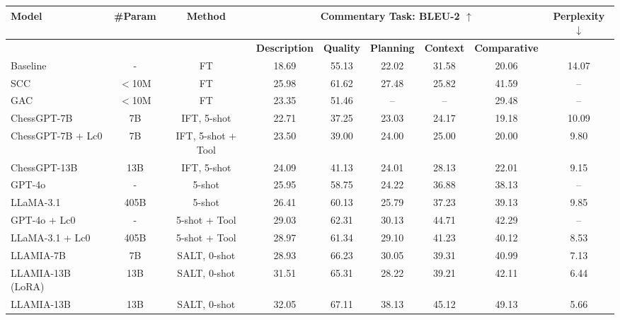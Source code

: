 \documentclass{article}
\newcommand{\valbest}[1]{\colorbox{valbest}{#1}}
\theoremstyle{plain}
\theoremstyle{definition}
\theoremstyle{remark}
\begin{document}
\begin{table}[!h]
    \centering
    \begin{adjustbox}{max width=0.99\textwidth}
    \begin{tabular}{lcc|ccccc|c}
    \toprule[1.2pt]
        \textbf{Model}& \textbf{\#Param} & \textbf{Method} & \multicolumn{5}{c}{\textbf{Commentary Task: BLEU-2 $\uparrow$}} & \textbf{Perplexity$\downarrow$}\\ \toprule
        &&&  \textbf{Description} & \textbf{Quality} & \textbf{Planning} & \textbf{Context} & \textbf{Comparative} \\
        \toprule
    \makecell{Baseline\\\cite{jhamtani-etal-2018-learning}} & - & FT & 18.69 & 55.13 & 22.02 & 31.58 & 20.06 & 14.07 \\
    \makecell{SCC\\\cite{zang2019automated}} & $<$10M & FT & 25.98 & 61.62 & 27.48 & 25.82 & 41.59 & -- \\
    \makecell{GAC\\\cite{jhamtani-etal-2018-learning}} & $<$10M & FT & 23.35 & 51.46 & -- & -- & 29.48 & -- \\
    \midrule
    ChessGPT-7B & 7B & IFT, 5-shot & 22.71 & 37.25 & 23.03 & 24.17 & 19.18 & 10.09 \\
    ChessGPT-7B + Lc0 & 7B & IFT, 5-shot + Tool & 23.50 & 39.00 & 24.00 & 25.00 & 20.00 & 9.80 \\
    ChessGPT-13B & 13B & IFT, 5-shot & 24.09 & 41.13 & 24.01 & 28.13 & 22.01 & 9.15 \\
    \midrule
    GPT-4o & - & 5-shot & 25.95 & 58.75 & 24.22 & 36.88 & 38.13 & -- \\
    LLaMA-3.1 & 405B & 5-shot & 26.41 & 60.13 & 25.79 & 37.23 & 39.13 & 9.85 \\
    GPT-4o + Lc0 & - & 5-shot + Tool & 29.03 & 62.31 & 30.13 & 44.71 & 42.29 & -- \\
    LLaMA-3.1 + Lc0 & 405B & 5-shot + Tool & 28.97 & 61.34 & 29.10 & 41.23 & 40.12 & 8.53 \\
    \midrule
    LLAMIA-7B & 7B & SALT, 0-shot & 28.93 & 66.23 & 30.05 & 39.31 & 40.99 & 7.13 \\
    LLAMIA-13B (LoRA) & 13B & SALT, 0-shot & 31.51 & 65.31 & 28.22 & 39.21 & 42.11 & 6.44 \\
    LLAMIA-13B & 13B & SALT, 0-shot & \valbest{32.05} & \valbest{67.11} & \valbest{38.13} & \valbest{45.12} & \valbest{49.13} & \valbest{5.66} \\
    \bottomrule[1.2pt]

\end{tabular}
\end{adjustbox}
\end{table}
\end{document}
